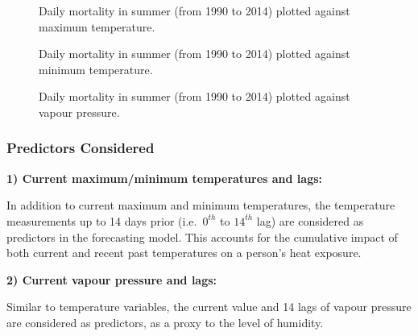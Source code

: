 \documentclass[
  11pt,
  a4paper,
]{article}
\begin{document}
\begin{figure}


\caption{\label{fig-Tmax}Daily mortality in summer (from 1990 to 2014)
plotted against maximum temperature.}

\end{figure}%

\begin{figure}


\caption{\label{fig-Tmin}Daily mortality in summer (from 1990 to 2014)
plotted against minimum temperature.}

\end{figure}%

\begin{figure}


\caption{\label{fig-Vp}Daily mortality in summer (from 1990 to 2014)
plotted against vapour pressure.}

\end{figure}%

\subsubsection{Predictors Considered}\label{predictors-considered}

\textbf{1) Current maximum/minimum temperatures and lags:}

In addition to current maximum and minimum temperatures, the temperature
measurements up to 14 days prior (i.e.~\(0^{th}\) to \(14^{th}\) lag)
are considered as predictors in the forecasting model. This accounts for
the cumulative impact of both current and recent past temperatures on a
person's heat exposure.

\textbf{2) Current vapour pressure and lags:}

Similar to temperature variables, the current value and 14 lags of
vapour pressure are considered as predictors, as a proxy to the level of
humidity.
\end{document}
